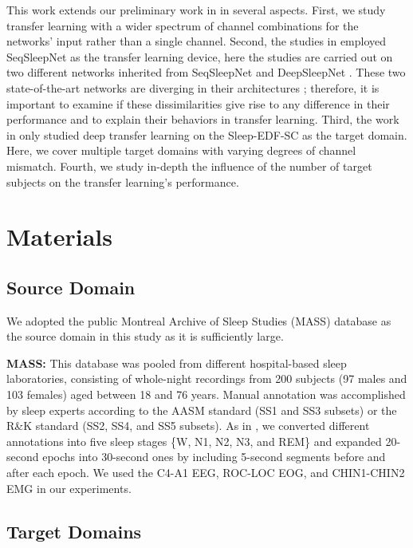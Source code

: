 \documentclass[journal,twoside,web]{ieeecolor}
\begin{document}
This work extends our preliminary work in \cite{Phan2019c} in several aspects. First, we study transfer learning with a wider spectrum of channel combinations for the networks' input rather than a single channel. Second, the studies in \cite{Phan2019c} employed SeqSleepNet \cite{Phan2019a} as the transfer learning device, here the studies are carried out on two different networks inherited from SeqSleepNet \cite{Phan2019a} and DeepSleepNet \cite{Supratak2017}. These two state-of-the-art networks are diverging in their architectures \cite{Phan2019d}; therefore, it is important to examine if these dissimilarities give rise to any difference in their performance and to explain their behaviors in transfer learning. Third, the work in \cite{Phan2019c} only studied deep transfer learning on the Sleep-EDF-SC as the target domain. Here, we cover multiple target domains with varying degrees of channel mismatch. Fourth, we study in-depth the influence of the number of target subjects on the transfer learning's performance.

\vspace{-0.15cm}
\section{Materials}
\vspace{-0.15cm}
\subsection{Source Domain}
We adopted the public Montreal Archive of Sleep Studies (MASS) database \cite{Oreilly2014} as the source domain in this study as it is sufficiently large. 

{\bf MASS:} This database was pooled from different hospital-based sleep laboratories, consisting of whole-night recordings from 200 subjects (97 males and 103 females) aged between 18 and 76 years. Manual annotation was accomplished by sleep experts according to the AASM standard \cite{Iber2007} (SS1 and SS3 subsets) or the R\&K standard \cite{Hobson1969}  (SS2, SS4, and SS5 subsets). As in \cite{Phan2019b,Phan2019a}, we converted different annotations into five sleep stages \{W, N1, N2, N3, and REM\} and expanded 20-second epochs into 30-second ones by including 5-second segments before and after each epoch. We used the C4-A1 EEG, ROC-LOC EOG, and CHIN1-CHIN2 EMG in our experiments.

\vspace{-0.15cm}
\subsection{Target Domains}
\end{document}
